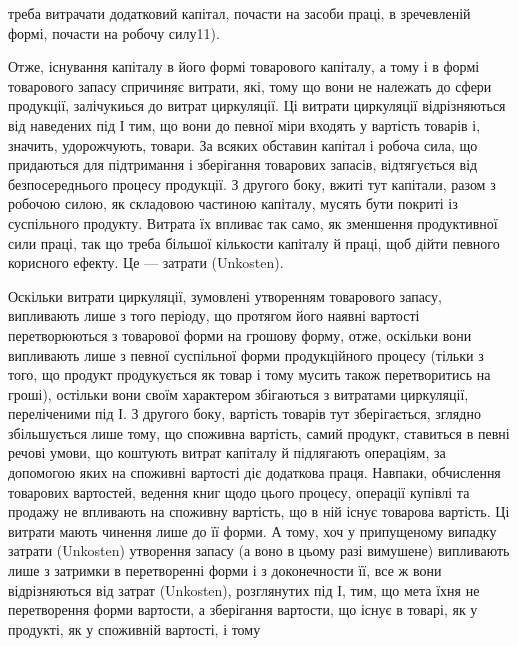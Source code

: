 \parcont{}  %
треба витрачати додатковий капітал, почасти на засоби праці, в зречевленій
формі, почасти на робочу силу11).

Отже, існування капіталу в його формі товарового капіталу, а тому
і в формі товарового запасу спричиняє витрати, які, тому що вони не належать
до сфери продукції, залічукиься до витрат циркуляції. Ці витрати
циркуляції відрізняються від наведених під І тим, що вони до певної
міри входять у вартість товарів і, значить, удорожчують, товари. За всяких
обставин капітал і робоча сила, що придаються для підтримання і
зберігання товарових запасів, відтягується від безпосереднього процесу
продукції. З другого боку, вжиті тут капітали, разом з робочою силою,
як складовою частиною капіталу, мусять бути покриті із суспільного
продукту. Витрата їх впливає так само, як зменшення продуктивної сили
праці, так що треба більшої кількости капіталу й праці, щоб дійти певного
корисного ефекту. Це — затрати (Unkosten).

Оскільки витрати циркуляції, зумовлені утворенням товарового запасу,
випливають лише з того періоду, що протягом його наявні вартості
перетворюються з товарової форми на грошову форму, отже, оскільки
вони випливають лише з певної суспільної форми продукційного процесу
(тільки з того, що продукт продукується як товар і тому мусить також
перетворитись на гроші), остільки вони своїм характером збігаються з витратами
циркуляції, переліченими під І. З другого боку, вартість товарів тут зберігається,
зглядно збільшується лише тому, що споживна вартість, самий
продукт, ставиться в певні речові умови, що коштують витрат капіталу й
підлягають операціям, за допомогою яких на споживні вартості діє
додаткова праця. Навпаки, обчислення товарових вартостей, ведення книг
щодо цього процесу, операції купівлі та продажу не впливають на споживну
вартість, що в ній існує товарова вартість. Ці витрати мають
чинення лише до її форми. А тому, хоч у припущеному випадку
затрати (Unkosten) утворення запасу (а воно в цьому разі вимушене)
випливають лише з затримки в перетворенні форми і з доконечности її,
все ж вони відрізняються від затрат (Unkosten), розглянутих під І, тим,
що мета їхня не перетворення форми вартости, а зберігання вартости,
що існує в товарі, як у продукті, як у споживній вартості, і тому

